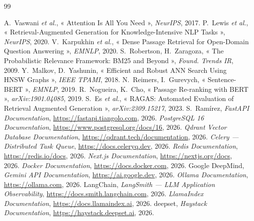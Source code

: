 \documentclass[12pt,a4paper,oneside]{report}
\begin{document}
\begin{thebibliography}{99}

 A.~Vaswani \emph{et al.}, « Attention Is All You Need », \emph{NeurIPS}, 2017.
 P.~Lewis \emph{et al.}, « Retrieval-Augmented Generation for Knowledge-Intensive NLP Tasks », \emph{NeurIPS}, 2020.
 V.~Karpukhin \emph{et al.}, « Dense Passage Retrieval for Open-Domain Question Answering », \emph{EMNLP}, 2020.
 S.~Robertson, H.~Zaragoza, « The Probabilistic Relevance Framework: BM25 and Beyond », \emph{Found. Trends IR}, 2009.
 Y.~Malkov, D.~Yashunin, « Efficient and Robust ANN Search Using HNSW Graphs », \emph{IEEE TPAMI}, 2018.
 N.~Reimers, I.~Gurevych, « Sentence-BERT », \emph{EMNLP}, 2019.
 R.~Nogueira, K.~Cho, « Passage Re-ranking with BERT », \emph{arXiv:1901.04085}, 2019.
 S.~Es \emph{et al.}, « RAGAS: Automated Evaluation of Retrieval Augmented Generation », \emph{arXiv:2309.15217}, 2023.
 S.~Ramírez, \emph{FastAPI Documentation}, \url{https://fastapi.tiangolo.com}, 2026.
 \emph{PostgreSQL 16 Documentation}, \url{https://www.postgresql.org/docs/16}, 2026.
 \emph{Qdrant Vector Database Documentation}, \url{https://qdrant.tech/documentation}, 2026.
 \emph{Celery — Distributed Task Queue}, \url{https://docs.celeryq.dev}, 2026.
 \emph{Redis Documentation}, \url{https://redis.io/docs}, 2026.
 \emph{Next.js Documentation}, \url{https://nextjs.org/docs}, 2026.
 \emph{Docker Documentation}, \url{https://docs.docker.com}, 2026.
 Google DeepMind, \emph{Gemini API Documentation}, \url{https://ai.google.dev}, 2026.
 \emph{Ollama Documentation}, \url{https://ollama.com}, 2026.
 LangChain, \emph{LangSmith — LLM Application Observability}, \url{https://docs.smith.langchain.com}, 2026.
 \emph{LlamaIndex Documentation}, \url{https://docs.llamaindex.ai}, 2026.
 deepset, \emph{Haystack Documentation}, \url{https://haystack.deepset.ai}, 2026.

\end{thebibliography}
\end{document}
